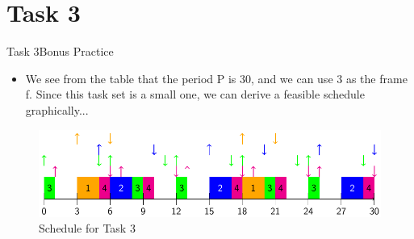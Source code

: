 
\section{Task 3}

\setcounter{task}{1}

\begin{frame}{Task 3}{Bonus Practice\vspace{0.5cm}}
  \begin{itemize}
    \item We see from the table that the period P is 30, and we can use 3 as the frame f. Since this task set is a small one, we can derive a feasible schedule graphically...
  \end{itemize}
  \begin{figure}
    \includegraphics[width=0.7\paperwidth]{./figures/task3_schedule.png}
    \caption{Schedule for Task 3}
  \end{figure}
\end{frame}
